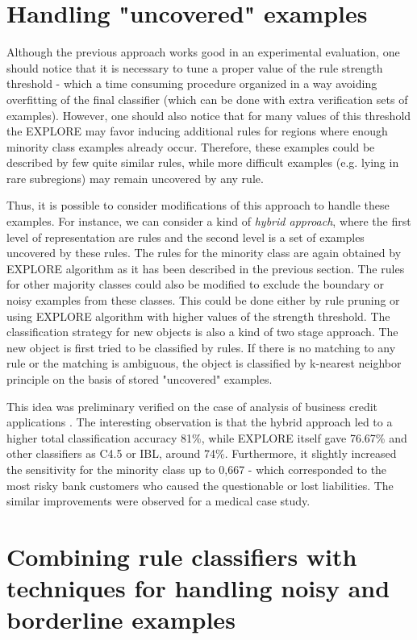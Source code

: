 \documentclass{AIMeth05}
\begin{document}
\section{Handling "uncovered" examples}

Although the previous approach works good in an experimental evaluation, one
should notice that it is necessary to tune a proper value of the rule
strength threshold - which  a time consuming procedure organized in a way
avoiding overfitting of the final classifier (which can be done with extra
verification sets of examples).  However, one should also notice that for
many values of this threshold the  EXPLORE may favor inducing additional
rules for regions where enough minority class examples already occur.
Therefore, these examples could be described by few quite similar  rules,
while more difficult examples (e.g. lying  in rare subregions) may remain
uncovered by any rule.

Thus, it is possible to consider modifications of this approach to handle
these examples. For instance, we can consider a kind of {\em hybrid
approach}, where the first level of representation are rules and the second
level is a set of examples uncovered by these rules. The rules for the
minority class are again obtained by EXPLORE algorithm as it has been
described in the previous section. The rules for other majority classes
could also be modified to exclude the boundary or noisy examples from these
classes. This could be done either by rule pruning or using EXPLORE
algorithm with higher values of the strength threshold. The classification
strategy for new objects is also a kind of two stage approach. The new
object is first tried to be classified by rules. If there is no matching to
any rule or the matching is ambiguous, the object is classified by k-nearest
neighbor principle on the basis of stored "uncovered" examples.

This idea was preliminary verified on the case of analysis of business
credit applications \cite{StefWilk}. The interesting observation is that the
hybrid approach led to a higher total classification accuracy 81\%, while
EXPLORE itself gave 76.67\% and other classifiers as C4.5 or IBL, around
74\%. Furthermore, it slightly increased the sensitivity for the minority
class up to 0,667 - which corresponded to the most risky bank customers who
caused the questionable or lost liabilities. The similar improvements were
observed for a medical case study.


\section{Combining rule classifiers with techniques for handling noisy and borderline
examples}
\end{document}

